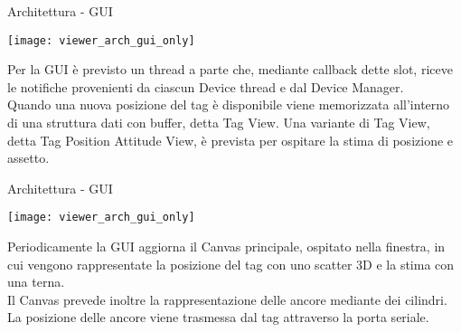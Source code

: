 \begin{frame}[shrink=10]{Architettura - GUI}
  \begin{center}
    \texttt{[image: viewer\_arch\_gui\_only]}
  \end{center}
  Per la GUI è previsto un thread a parte che, mediante callback dette slot, riceve le notifiche
  provenienti da ciascun Device thread e dal Device Manager.\\
  Quando una nuova posizione del tag è disponibile viene memorizzata all'interno di una struttura dati
  con buffer, detta Tag View. Una variante di Tag View, detta Tag Position Attitude View, è prevista
  per ospitare la stima di posizione e assetto.\\
\end{frame}

\begin{frame}[shrink=10]{Architettura - GUI}
  \begin{center}
    \texttt{[image: viewer\_arch\_gui\_only]}
  \end{center}
  Periodicamente la GUI aggiorna il Canvas principale, ospitato nella finestra, in cui vengono rappresentate la posizione del tag con uno scatter 3D e la stima con una terna.\\
  Il Canvas prevede inoltre la rappresentazione delle ancore mediante dei cilindri. La posizione delle ancore
  viene trasmessa dal tag attraverso la porta seriale.
\end{frame}


